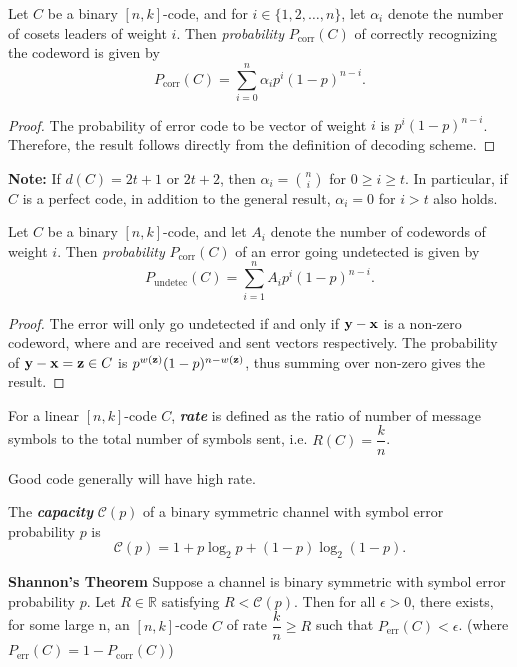 \documentclass[../main.tex]{subfiles}
\begin{document}
\begin{thm}
	Let $C$ be a binary $[n,k]$-code, and for $i\in \{1,2,\ldots,n\}$, let $\alpha_i$ denote the number of cosets leaders of weight $i$. Then \emph{probability} $P_{\text{corr}}(C)$ of correctly recognizing the codeword is given by
	\[
		P_{\text{corr}}(C) = \displaystyle\sum_{i=0}^{n}\alpha_ip^i(1-p)^{n-i}.
	\]
\end{thm}
\begin{proof}
	The probability of error code to be vector of weight $i$ is $p^i(1-p)^{n-i}$. Therefore, the result follows directly from the definition of decoding scheme.
\end{proof}
\textbf{Note:} If $d(C)=2t+1$ or $2t+2$, then $\alpha_i=\binom{n}{i}$ for $0\geq i\geq t$. In particular, if $C$ is a perfect code, in addition to the general result, $\alpha_i=0$ for $i>t$ also holds.

\begin{thm}
	Let $C$ be a binary $[n,k]$-code, and let $A_i$ denote the number of codewords of weight $i$. Then \emph{probability} $P_{\text{corr}}(C)$ of an error going undetected is given by
	\[
		P_{\text{undetec}}(C) = \displaystyle\sum_{i=1}^{n}A_ip^i(1-p)^{n-i}.
	\]
\end{thm}
\begin{proof}
	The error will only go undetected if and only if $\textbf{y}-\textbf{x}$ is a non-zero codeword, where  and  are received and sent vectors respectively. The probability of $\textbf{y}-\textbf{x} = \textbf{z}\in C$ is $p^{w(\textbf{z})}(1-p)^{n-w(\textbf{z})}$, thus summing over non-zero  gives the result. 
\end{proof}

\begin{defn}
	For a linear $[n,k]$-code $C$, \textbf{\emph{rate}} is defined as the ratio of number of message symbols to the total number of symbols sent, i.e. $R(C)=\dfrac{k}{n}$.
\end{defn}
Good code generally will have high rate.
\begin{defn}
	The \textbf{\emph{capacity}} $\mathscr{C}(p)$ of a binary symmetric channel with symbol error probability $p$ is
	\[
		\mathscr{C}(p) = 1 + p\log_2p + (1-p)\log_2(1-p).
	\] 
\end{defn}

\begin{thm}{\textbf{Shannon's Theorem}}
	Suppose a channel is binary symmetric with symbol error probability $p$. Let $R\in \mathbb{R}$ satisfying $R<\mathscr{C}(p)$. Then for all $\epsilon > 0$, there exists, for some large n, an $[n,k]$-code $C$ of rate $\dfrac{k}{n} \geq R$ such that $P_{\text{err}}(C)<\epsilon$. (where $P_{\text{err}}(C) = 1-P_{\text{corr}}(C)$)
\end{thm}
\end{document}
